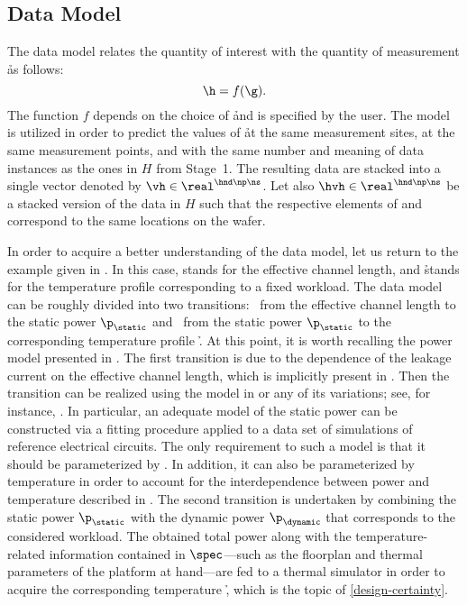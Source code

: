 \subsection{Data Model}

The data model relates the quantity of interest \g with the quantity of
measurement \h as follows:
\[
  \h = f(\g).
\]
The function $f$ depends on the choice of \h and is specified by the user. The
model is utilized in order to predict the values of \h at the same measurement
sites, at the same measurement points, and with the same number and meaning of
data instances as the ones in $H$ from Stage~1. The resulting data are stacked
into a single vector denoted by $\vh \in \real^{\hnd \np \ns}$. Let also $\hvh
\in \real^{\hnd \np \ns}$ be a stacked version of the data in $H$ such that the
respective elements of \vh and \hvh correspond to the same locations on the
wafer.

In order to acquire a better understanding of the data model, let us return to
the example given in . In this case, \g stands for the
effective channel length, and \h stands for the temperature profile
corresponding to a fixed workload. The data model can be roughly divided into
two transitions: \one~from the effective channel length \g to the static power
$\p_\static$ and \two~from the static power $\p_\static$ to the corresponding
temperature profile \h. At this point, it is worth recalling the power model
presented in . The first transition is due to the dependence
of the leakage current on the effective channel length, which is implicitly
present in . Then the transition can be realized using the
model in  or any of its variations; see, for instance,
\cite{chandrakasan2000, srivastava2010, juan2012}. In particular, an adequate
model of the static power can be constructed via a fitting procedure applied to
a data set of  simulations of reference electrical circuits. The only
requirement to such a model is that it should be parameterized by \g. In
addition, it can also be parameterized by temperature in order to account for
the interdependence between power and temperature described in
. The second transition is undertaken by
combining the static power $\p_\static$ with the dynamic power $\p_\dynamic$
that corresponds to the considered workload. The obtained total power along with
the temperature-related information contained in $\spec$---such as the floorplan
and thermal parameters of the platform at hand---are fed to a thermal simulator
in order to acquire the corresponding temperature \h, which is the topic of
\cref{design-certainty}.

